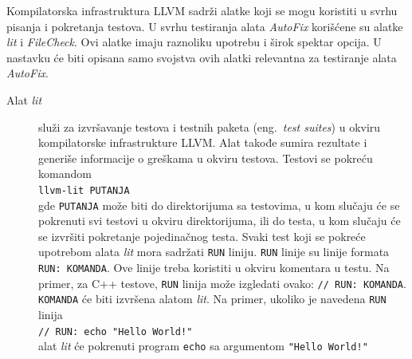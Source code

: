 \documentclass[12pt,oneside]{memoir}
\begin{document}
Kompilatorska infrastruktura LLVM sadr\v{z}i alatke koji se mogu koristiti u svrhu pisanja i pokretanja testova. U svrhu testiranja alata \textit{AutoFix}
kori\v{s}\'{c}ene su alatke \textit{lit} i \textit{FileCheck}. Ovi alatke imaju raznoliku upotrebu i \v{s}irok spektar opcija. U nastavku \'{c}e biti opisana samo svojstva ovih alatki relevantna za testiranje alata \textit{AutoFix}. \par
\begin{description}
\item[Alat \textit{lit}] slu\v{z}i za izvr\v{s}avanje testova i testnih paketa (eng.~\textit{test suites}) u okviru kompilatorske infrastrukture LLVM. Alat takođe sumira rezultate i generi\v{s}e informacije o gre\v{s}kama u okviru testova.
Testovi se pokre\'{c}u komandom \\
\texttt{llvm-lit PUTANJA}
\\
gde \texttt{PUTANJA} mo\v{z}e biti do direktorijuma sa testovima, u kom slu\v{c}aju \'{c}e se pokrenuti svi testovi u okviru direktorijuma, ili do testa, u kom slu\v{c}aju \'{c}e se izvr\v{s}iti pokretanje pojedina\v{c}nog testa.
Svaki test koji se pokre\'{c}e upotrebom alata \textit{lit} mora sadr\v{z}ati \texttt{RUN} liniju. \texttt{RUN} linije su linije formata \texttt{RUN: KOMANDA}. Ove linije treba koristiti u okviru komentara u testu. Na primer, za C++ testove, \texttt{RUN} linija mo\v{z}e izgledati ovako: \texttt{// RUN: KOMANDA}. \\ \texttt{KOMANDA} \'{c}e biti izvr\v{s}ena alatom \textit{lit}. Na primer, ukoliko je navedena \texttt{RUN} linija \\
\texttt{// RUN: echo "Hello World!"} \\
alat \textit{lit} \'{c}e pokrenuti program \texttt{echo} sa argumentom \texttt{"Hello World!"}


\end{description}
\end{document}
